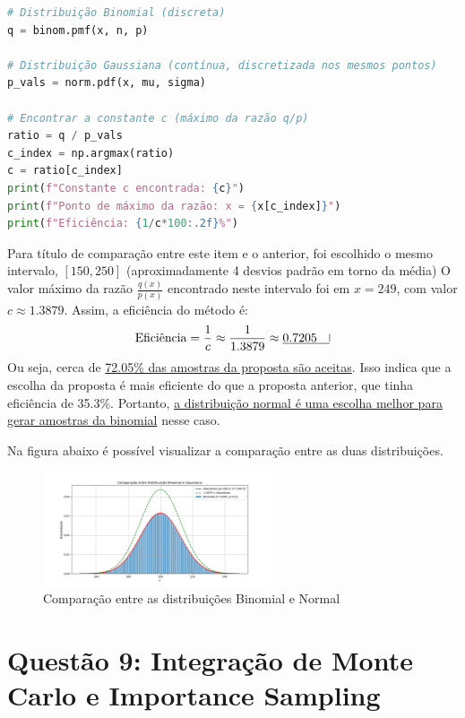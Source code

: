\documentclass[12 pt]{article}
\begin{document}
\begin{enumerate}
\begin{tcolorbox}[colframe=black, title=Resposta:]
\begin{lstlisting}[language=Python]
# Distribuição Binomial (discreta)
q = binom.pmf(x, n, p)

# Distribuição Gaussiana (contínua, discretizada nos mesmos pontos)
p_vals = norm.pdf(x, mu, sigma)

# Encontrar a constante c (máximo da razão q/p)
ratio = q / p_vals
c_index = np.argmax(ratio)
c = ratio[c_index]
print(f"Constante c encontrada: {c}")
print(f"Ponto de máximo da razão: x = {x[c_index]}")
print(f"Eficiência: {1/c*100:.2f}%")
        \end{lstlisting}
    \end{tcolorbox}            
\end{enumerate}

\begin{tcolorbox}[colframe=black, title=Resposta (continuação):]
    Para título de comparação entre este item e o anterior, foi escolhido o mesmo intervalo, $[150, 250]$ (aproximadamente 4 desvios padrão em torno da média)
        O valor máximo da razão $\frac{q(x)}{p(x)}$ encontrado neste intervalo foi em $x = 249$, com valor \underline{$c \approx 1.3879$}. Assim, a eficiência do método é: 
        $$
        \text{Eficiência} = \frac{1}{c} \approx \frac{1}{1.3879} \approx \underline{0.7205 \quad \vline}
        $$
        Ou seja, cerca de \underline{72.05\% das amostras da proposta são aceitas}. Isso indica que a escolha da proposta é mais eficiente do que a proposta anterior, que tinha eficiência de 35.3\%. Portanto, \underline{a distribuição normal é uma escolha melhor para gerar amostras da binomial} nesse caso.

        Na figura abaixo é possível visualizar a comparação entre as duas distribuições.
\end{tcolorbox}

\begin{figure}[H]
    \centering
    \includegraphics[width=0.6\textwidth]{q8.png}
    \caption{Comparação entre as distribuições Binomial e Normal}
    \label{fig:comparacao_distribuicoes}
\end{figure}

\newpage
\section*{Questão 9: Integração de Monte Carlo e Importance Sampling}
\end{document}
